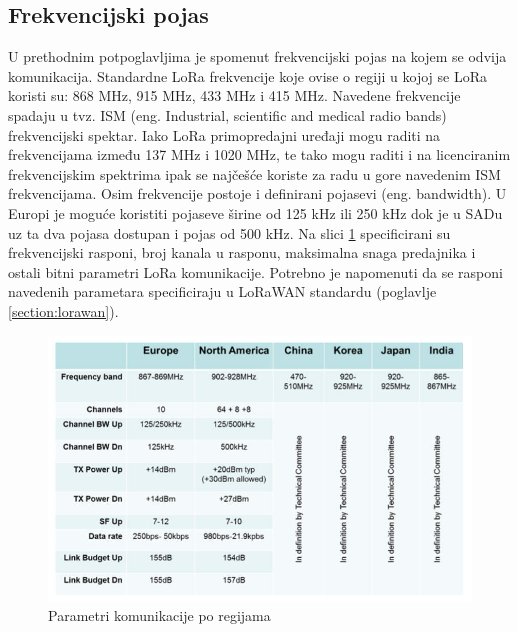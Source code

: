\subsection{Frekvencijski pojas}
\label{subsection:lora_freq}
U prethodnim potpoglavljima je spomenut frekvencijski pojas na kojem se odvija komunikacija. Standardne LoRa frekvencije koje ovise o regiji u kojoj se LoRa koristi su: 868 MHz, 915 MHz, 433 MHz i 415 MHz. Navedene frekvencije spadaju u tvz. ISM (eng. Industrial, scientific and medical radio bands) frekvencijski spektar. Iako LoRa primopredajni uređaji mogu raditi na frekvencijama između 137 MHz i 1020 MHz, te tako mogu raditi i na licenciranim frekvencijskim spektrima ipak se najčešće koriste za radu u gore navedenim ISM frekvencijama. Osim frekvencije postoje i definirani pojasevi (eng. bandwidth). U Europi je moguće koristiti pojaseve širine od 125 kHz ili 250 kHz dok je u SADu uz ta dva pojasa dostupan i pojas od 500 kHz.
Na slici \ref{img:bands} specificirani su frekvencijski rasponi, broj kanala u rasponu, maksimalna snaga predajnika i ostali bitni parametri LoRa komunikacije. Potrebno je napomenuti da se rasponi navedenih parametara specificiraju u LoRaWAN standardu (poglavlje \ref{section:lorawan}).

\begin{figure}[ht!]
	\centering
	\includegraphics[width=1.0\textwidth]{images/bands.jpg}
	\caption{Parametri komunikacije po regijama}
	\label{img:bands}
\end{figure}

